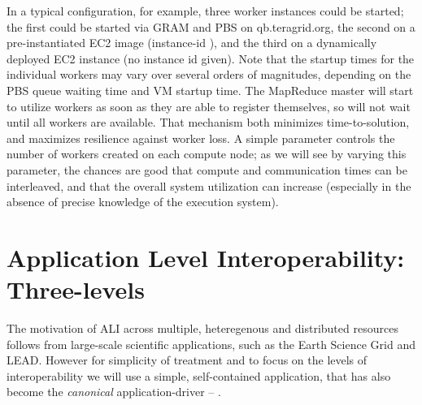 \documentclass[3p,twocolumn]{elsarticle}
\begin{document}
In a typical configuration, for example, three worker instances could
be started; the first could be started via GRAM and PBS on
qb.teragrid.org, the second on a pre-instantiated EC2 image
(instance-id ), and the third on a dynamically deployed
EC2 instance (no instance id given).  Note that the startup times for
the individual workers may vary over several orders of magnitudes,
depending on the PBS queue waiting time and VM startup time.  The
MapReduce master will start to utilize workers as soon as they are
able to register themselves, so will not wait until all workers are
available.  That mechanism both minimizes time-to-solution, and
maximizes resilience against worker loss.
%
%
A simple parameter controls the number of workers created on each
compute node; as we will see by varying this parameter, the chances
are good that compute and communication times can be interleaved, and
that the overall system utilization can increase (especially in the
absence of precise knowledge of the execution system).
 

\section{Application Level Interoperability: Three-levels}
\label{sec:interop}

The motivation of ALI across multiple, heteregenous and distributed
resources follows from large-scale scientific applications, such as
the Earth Science Grid and LEAD. However for simplicity of treatment
and to focus on the levels of interoperability we will use a simple,
self-contained application, that has also become the {\it canonical}
\mr application-driver -- \wc.
\end{document}
